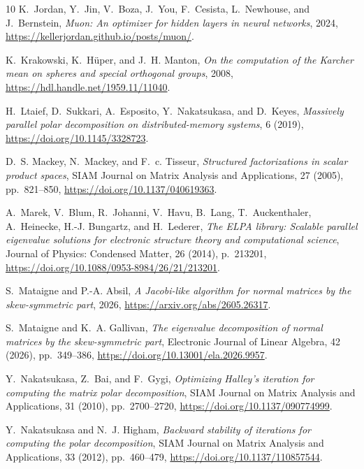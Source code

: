 \documentclass[final,onefignum,onetabnum,dvipsnames]{siamart251216}
\numberwithin{algorithm}{section}
\numberwithin{equation}{section}
\begin{document}
\begin{thebibliography}{10}
{\sc K.~Jordan, Y.~Jin, V.~Boza, J.~You, F.~Cesista, L.~Newhouse, and J.~Bernstein}, {\em Muon: An optimizer for hidden layers in neural networks}, 2024, \url{https://kellerjordan.github.io/posts/muon/}.

{\sc K.~Krakowski, K.~H{\"u}per, and J.~H. Manton}, {\em On the computation of the {K}archer mean on spheres and special orthogonal groups}, 2008, \url{https://hdl.handle.net/1959.11/11040}.

{\sc H.~Ltaief, D.~Sukkari, A.~Esposito, Y.~Nakatsukasa, and D.~Keyes}, {\em Massively parallel polar decomposition on distributed-memory systems}, 6 (2019), \url{https://doi.org/10.1145/3328723}.

{\sc D.~S. Mackey, N.~Mackey, and F.~c. Tisseur}, {\em Structured factorizations in scalar product spaces}, SIAM Journal on Matrix Analysis and Applications, 27 (2005), pp.~821--850, \url{https://doi.org/10.1137/040619363}.

{\sc A.~Marek, V.~Blum, R.~Johanni, V.~Havu, B.~Lang, T.~Auckenthaler, A.~Heinecke, H.-J. Bungartz, and H.~Lederer}, {\em The {ELPA} library: Scalable parallel eigenvalue solutions for electronic structure theory and computational science}, Journal of Physics: Condensed Matter, 26 (2014), p.~213201, \url{https://doi.org/10.1088/0953-8984/26/21/213201}.

{\sc S.~Mataigne and P.-A. Absil}, {\em A {J}acobi-like algorithm for normal matrices by the skew-symmetric part}, 2026, \url{https://arxiv.org/abs/2605.26317}.

{\sc S.~Mataigne and K.~A. Gallivan}, {\em The eigenvalue decomposition of normal matrices by the skew-symmetric part}, Electronic Journal of Linear Algebra, 42 (2026), pp.~349--386, \url{https://doi.org/10.13001/ela.2026.9957}.

{\sc Y.~Nakatsukasa, Z.~Bai, and F.~Gygi}, {\em Optimizing {H}alley's iteration for computing the matrix polar decomposition}, SIAM Journal on Matrix Analysis and Applications, 31 (2010), pp.~2700--2720, \url{https://doi.org/10.1137/090774999}.

{\sc Y.~Nakatsukasa and N.~J. Higham}, {\em Backward stability of iterations for computing the polar decomposition}, SIAM Journal on Matrix Analysis and Applications, 33 (2012), pp.~460--479, \url{https://doi.org/10.1137/110857544}.


\end{thebibliography}
\end{document}
